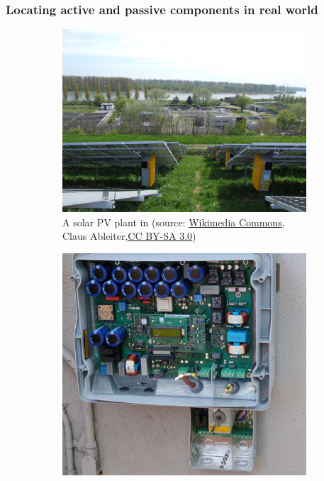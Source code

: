 \begin{frame}
	\frametitle{Locating active and passive components in real world}
	\begin{figure}
		\centering
		\begin{subfigure}[t]{0.4\textwidth}
			\centering
			\includegraphics[scale=0.05]{fig/lec01/solar_inverter.jpg}
			\caption{A solar PV plant in  (source: \href{https://commons.wikimedia.org/wiki/File:Müllberg_Speyer_-_6_-_Rückseite_der_östlichen_Solarpanele.JPG}{Wikimedia Commons}, Claus Ableiter,\href{https://creativecommons.org/licenses/by-sa/3.0}{CC BY-SA 3.0})}
		\end{subfigure}
		\begin{subfigure}[t]{0.4\textwidth}
			\centering
			\includegraphics[scale=0.1]{fig/lec01/solar_inverter_open.jpg}

\end{subfigure}
\end{figure}
\end{frame}

